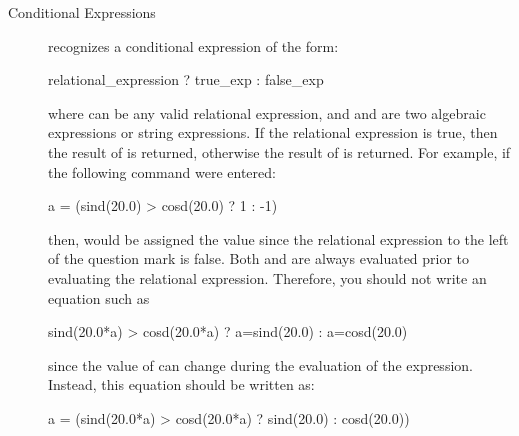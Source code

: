 \begin{description}
\item[Conditional Expressions] \aprepro{} recognizes a conditional
expression of the form:
\begin{apinp}
relational\_expression ? true\_exp :  false\_exp
\end{apinp}
where  can be any valid
relational expression, and  and
 are two algebraic expressions or string expressions. If the
relational expression is true, then the result of
 is returned, otherwise the result of
 is returned. For example, if the
following command were entered:
\begin{apinp}
a = (sind(20.0) > cosd(20.0) ? 1 : -1)
\end{apinp}
then,  would be assigned the value  since the relational expression
to the left of the question mark is false. Both \textit{} and
\textit{} are always evaluated prior to evaluating the relational
expression. Therefore, you should not write an equation such as
\begin{apinp}
sind(20.0*a) > cosd(20.0*a) ? a=sind(20.0) : a=cosd(20.0)
\end{apinp}
since the value of  can change during the evaluation of the expression.
Instead, this equation should be written as:
\begin{apinp}
a = (sind(20.0*a) > cosd(20.0*a) ? sind(20.0) : cosd(20.0))
\end{apinp}
\end{description}
